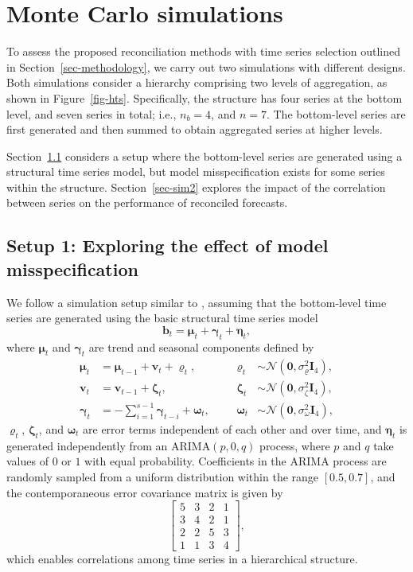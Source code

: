 \documentclass[
  11pt]{article}
\begin{document}
\hypertarget{sec-simulations}{%
\section{Monte Carlo simulations}\label{sec-simulations}}

To assess the proposed reconciliation methods with time series selection
outlined in Section~\ref{sec-methodology}, we carry out two simulations
with different designs. Both simulations consider a hierarchy comprising
two levels of aggregation, as shown in Figure~\ref{fig-hts}.
Specifically, the structure has four series at the bottom level, and
seven series in total; i.e., \(n_b = 4\), and \(n = 7\). The
bottom-level series are first generated and then summed to obtain
aggregated series at higher levels.

Section~\ref{sec-sim1} considers a setup where the bottom-level series
are generated using a structural time series model, but model
misspecification exists for some series within the structure.
Section~\ref{sec-sim2} explores the impact of the correlation between
series on the performance of reconciled forecasts.

\hypertarget{sec-sim1}{%
\subsection{Setup 1: Exploring the effect of model
misspecification}\label{sec-sim1}}

We follow a simulation setup similar to \citet{Wickramasuriya2019-fc},
assuming that the bottom-level time series are generated using the basic
structural time series model \[
\bm{b}_t=\bm{\mu}_t+\bm{\gamma}_t+\bm{\eta}_t,
\] where \(\bm{\mu}_t\) and \(\bm{\gamma}_t\) are trend and seasonal
components defined by \begin{align*}
\bm{\mu}_t & =\bm{\mu}_{t-1}+\bm{v}_t+\bm{\varrho}_t, &&& \bm{\varrho}_t & \sim \mathcal{N}\left(\bm{0}, \sigma_{\varrho}^2 \bm{I}_4\right), \\
\bm{v}_t & =\bm{v}_{t-1}+\bm{\zeta}_t, &&& \bm{\zeta}_t & \sim \mathcal{N}\left(\bm{0}, \sigma_\zeta^2 \bm{I}_4\right), \\
\bm{\gamma}_t & =-\sum_{i=1}^{s-1} \bm{\gamma}_{t-i}+\bm{\omega}_t, &&& \bm{\omega}_t & \sim \mathcal{N}\left(\bm{0}, \sigma_\omega^2 \bm{I}_4\right),
\end{align*} \(\bm{\varrho}_t\), \(\bm{\zeta}_t\), and \(\bm{\omega}_t\)
are error terms independent of each other and over time, and
\(\bm{\eta}_t\) is generated independently from an
\(\text{ARIMA}(p,0,q)\) process, where \(p\) and \(q\) take values of
\(0\) or \(1\) with equal probability. Coefficients in the ARIMA process
are randomly sampled from a uniform distribution within the range
\([0.5, 0.7]\), and the contemporaneous error covariance matrix is given
by \[
\left[\begin{array}{llll}
5 & 3 & 2 & 1 \\
3 & 4 & 2 & 1 \\
2 & 2 & 5 & 3 \\
1 & 1 & 3 & 4
\end{array}\right],
\] which enables correlations among time series in a hierarchical
structure.
\end{document}
